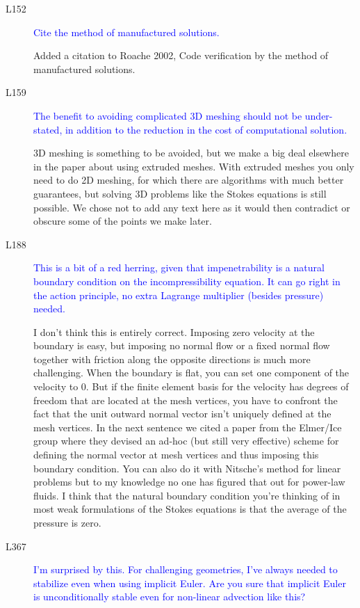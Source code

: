 \documentclass{article}
\theoremstyle{definition}
\theoremstyle{plain}
\begin{document}
\begin{description}
\item[L152] \textcolor{blue}{Cite the method of manufactured solutions.}

Added a citation to Roache 2002, Code verification by the method of manufactured solutions.

\item[L159] \textcolor{blue}{The benefit to avoiding complicated 3D meshing should not be under-
stated, in addition to the reduction in the cost of computational solution.}

3D meshing is something to be avoided, but we make a big deal elsewhere in the paper about using extruded meshes.
With extruded meshes you only need to do 2D meshing, for which there are algorithms with much better guarantees, but solving 3D problems like the Stokes equations is still possible.
We chose not to add any text here as it would then contradict or obscure some of the points we make later.

\item[L188] \textcolor{blue}{This is a bit of a red herring, given that impenetrability is a natural
boundary condition on the incompressibility equation. It can go right
in the action principle, no extra Lagrange multiplier (besides pressure)
needed.}

I don't think this is entirely correct.
Imposing zero velocity at the boundary is easy, but imposing no normal flow or a fixed normal flow together with friction along the opposite directions is much more challenging.
When the boundary is flat, you can set one component of the velocity to 0.
But if the finite element basis for the velocity has degrees of freedom that are located at the mesh vertices, you have to confront the fact that the unit outward normal vector isn't uniquely defined at the mesh vertices.
In the next sentence we cited a paper from the Elmer/Ice group where they devised an ad-hoc (but still very effective) scheme for defining the normal vector at mesh vertices and thus imposing this boundary condition.
You can also do it with Nitsche's method for linear problems but to my knowledge no one has figured that out for power-law fluids.
I think that the natural boundary condition you're thinking of in most weak formulations of the Stokes equations is that the average of the pressure is zero.

\item[L367] \textcolor{blue}{I’m surprised by this. For challenging geometries, I’ve always needed to
stabilize even when using implicit Euler. Are you sure that implicit Euler
is unconditionally stable even for non-linear advection like this?}


\end{description}
\end{document}
